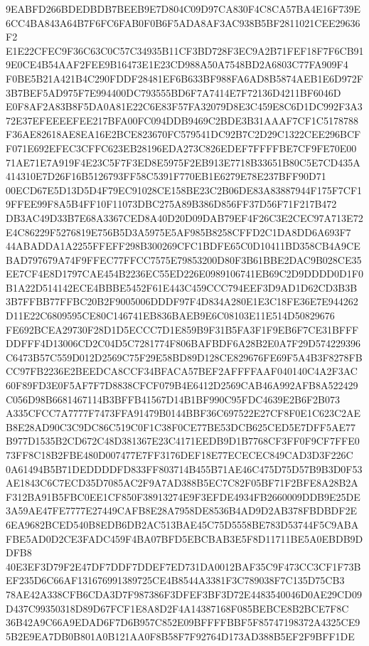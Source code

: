 \documentclass[UTF8,fontset=fandol,zihao=-4,a4paper]{ctexart}
\begin{document}
{{9EABFD266BDEDBDB7BEEB9E7D804C09D97CA830F4C8CA57BA4E16F739E6CC4BA843A64B7F6FC6FAB0F0B6F5ADA8AF3AC938B5BF2811021CEE29636F2
E1E22CFEC9F36C63C0C57C34935B11CF3BD728F3EC9A2B71FEF18F7F6CB919E0CE4B54AAF2FEE9B16473E1E23CD988A50A7548BD2A6803C77FA909F4
F0BE5B21A421B4C290FDDF28481EF6B633BF988FA6AD8B5874AEB1E6D972F3B7BEF5AD975F7E994400DC793555BD6F7A7414E7F72136D4211BF6046D
E0F8AF2A83B8F5DA0A81E22C6E83F57FA32079D8E3C459E8C6D1DC992F3A372E37EFEEEEFEE217BFA00FC094DDB9469C2BDE3B31AAAF7CF1C5178788
F36AE82618AE8EA16E2BCE823670FC579541DC92B7C2D29C1322CEE296BCFF071E692EFEC3CFFC623EB28196EDA273C826EDEF7FFFFBE7CF9FE70E00
71AE71E7A919F4E23C5F7F3ED8E5975F2EB913E7718B33651B80C5E7CD435A414310E7D26F16B5126793FF58C5391F770EB1E6279E78E237BFF90D71
00ECD67E5D13D5D4F79EC91028CE158BE23C2B06DE83A83887944F175F7CF19FFEE99F8A5B4FF10F11073DBC275A89B386D856FF37D56F71F217B472
DB3AC49D33B7E68A3367CED8A40D20D09DAB79EF4F26C3E2CEC97A713E72E4C86229F5276819E756B5D3A5975E5AF985B8258CFFD2C1DA8DD6A693F7
44ABADDA1A2255FFEFF298B300269CFC1BDFE65C0D10411BD358CB4A9CEBAD797679A74F9FFEC77FFCC7575E79853200D80F3B61BBE2DAC9B028CE35
EE7CF4E8D1797CAE454B2236EC55ED226E0989106741EB69C2D9DDDD0D1F0B1A22D514142ECE4BBBE5452F61E443C459CCC794EEF3D9AD1D62CD3B3B
3B7FFBB77FFBC20B2F9005006DDDF97F4D834A280E1E3C18FE36E7E944262D11E22C6809595CE80C146741EB836BAEB9E6C08103E11E514D50829676
FE692BCEA29730F28D1D5ECCC7D1E859B9F31B5FA3F1F9EB6F7CE31BFFFDDFFF4D13006CD2C04D5C7281774F806BAFBDF6A28B2E0A7F29D574229396
C6473B57C559D012D2569C75F29E58BD89D128CE829676FE69F5A4B3F8278FBCC97FB2236E2BEEDCA8CCF34BFACA57BEF2AFFFFAAF040140C4A2F3AC
60F89FD3E0F5AF7F7D8838CFCF079B4E6412D2569CAB46A992AFB8A522429C056D98B6681467114B3BFFB41567D14B1BF990C95FDC4639E2B6F2B073
A335CFCC7A7777F7473FFA91479B0144BBF36C697522E27CF8F0E1C623C2AEB8E28AD90C3C9DC86C519C0F1C38F0CE77BE53DCB625CED5E7DFF5AE77
B977D1535B2CD672C48D381367E23C4171EEDB9D1B7768CF3FF0F9CF7FFE073FF8C18B2FBE480D007477E7FF3176DEF18E77ECECEC849CAD3D3F226C
0A61494B5B71DEDDDDFD833FF803714B455B71AE46C475D75D57B9B3D0F53AE1843C6C7ECD35D7085AC2F9A7AD388B5EC7C82F05BF71F2BFE8A28B2A
F312BA91B5FBC0EE1CF850F38913274E9F3EFDE4934FB2660009DDB9E25DE3A59AE47FE7777E27449CAFB8E28A7958DE8536B4AD9D2AB378FBDBDF2E
6EA9682BCED540B8EDB6DB2AC513BAE45C75D5558BE783D53744F5C9ABAFBE5AD0D2CE3FADC459F4BA07BFD5EBCBAB3E5F8D11711BE5A0EBDB9DDFB8
40E3EF3D79F2E47DF7DDF7DDEF7ED731DA0012BAF35C9F473CC3CF1F73BEF235D6C66AF131676991389725CE4B8544A3381F3C789038F7C135D75CB3
78AE42A338CFB6CDA3D7F987386F3DFEF3BF3D72E4483540046D0AE29CD09D437C99350318D89D67FCF1E8A8D2F4A14387168F085BEBCE8B2BCE7F8C
36B42A9C66A9EDAD6F7D6B957C852E09BFFFFBBF5F85747198372A4325CE95B2E9EA7DB0B801A0B121AA0F8B58F7F92764D173AD388B5EF2F9BFF1DE
}}
\end{document}
